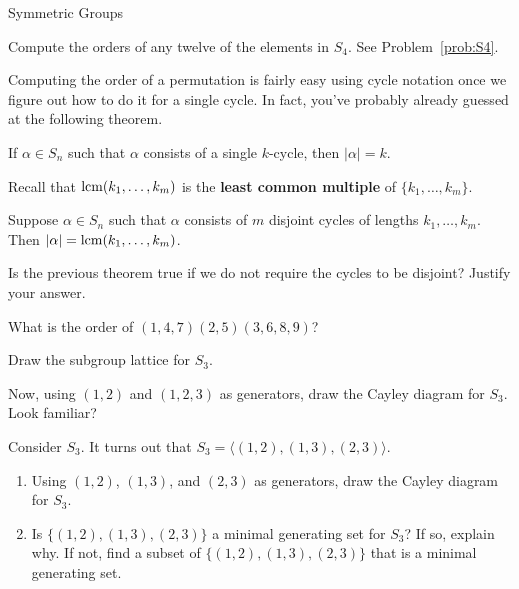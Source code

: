 \begin{section}{Symmetric Groups}
\begin{problem}
Compute the orders of any twelve of the elements in $S_4$.  See Problem~\ref{prob:S4}.
\end{problem}

Computing the order of a permutation is fairly easy using cycle notation once we figure out how to do it for a single cycle.  In fact, you've probably already guessed at the following theorem.

\begin{theorem}
If $\alpha\in S_n$ such that $\alpha$ consists of a single $k$-cycle, then $|\alpha|=k$.
\end{theorem}

Recall that $\operatorname{lcm}(k_1,\ldots, k_m)$ is the \textbf{least common multiple} of $\{k_1,\ldots, k_m\}$.

\begin{theorem}
Suppose $\alpha\in S_n$ such that $\alpha$ consists of $m$ disjoint cycles of lengths $k_1,\ldots, k_m$.  Then $|\alpha|=\operatorname{lcm}(k_1,\ldots, k_m)$. 
\end{theorem}

\begin{problem}
Is the previous theorem true if we do not require the cycles to be disjoint?  Justify your answer.
\end{problem}

\begin{problem}
What is the order of $(1,4,7)(2,5)(3,6,8,9)$?
\end{problem}

\begin{problem}
Draw the subgroup lattice for $S_3$.
\end{problem}

\begin{problem}
Now, using $(1,2)$ and $(1,2,3)$ as generators, draw the Cayley diagram for $S_3$.  Look familiar?
\end{problem}

\begin{problem}
Consider $S_3$. It turns out that $S_3=\langle (1,2),(1,3),(2,3)\rangle$.
\begin{enumerate}[label=\textrm{(\alph*)}]
\item Using $(1,2)$, $(1,3)$, and $(2,3)$ as generators, draw the Cayley diagram for $S_3$.
\item Is $\{(1,2),(1,3),(2,3)\}$ a minimal generating set for $S_3$?  If so, explain why.  If not, find a subset of $\{(1,2),(1,3),(2,3)\}$ that is a minimal generating set.
\end{enumerate}
\end{problem}


\end{section}
